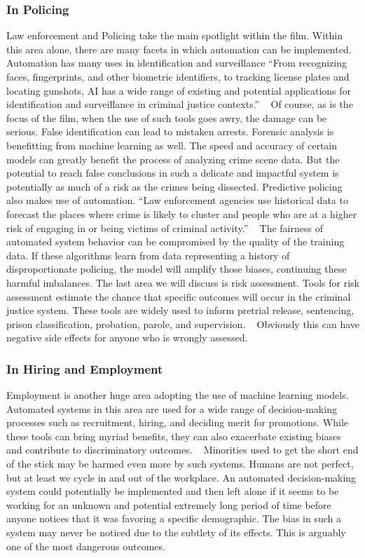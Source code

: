 \documentclass[sigconf, 10pt]{acmart}
\begin{document}
\subsubsection{In Policing}
Law enforcement and Policing take the main spotlight within the film. Within this area alone, there are many facets in which automation can be implemented. Automation has many uses in identification and surveillance “From recognizing faces, fingerprints, and other biometric identifiers, to tracking license plates and locating gunshots, AI has a wide range of existing and potential applications for identification and surveillance in criminal justice contexts.” ~\cite{used_fifth(4)} Of course, as is the focus of the film, when the use of such tools goes awry, the damage can be serious. False identification can lead to mistaken arrests. Forensic analysis is benefitting from machine learning as well. The speed and accuracy of certain models can greatly benefit the process of analyzing crime scene data. But the potential to reach false conclusions in such a delicate and impactful system is potentially as much of a risk as the crimes being dissected. Predictive policing also makes use of automation. “Law enforcement agencies use historical data to forecast the places where crime is likely to cluster and people who are at a higher risk of engaging in or being victims of criminal activity.” ~\cite{used_fifth(4)} The fairness of automated system behavior can be compromised by the quality of the training data. If these algorithms learn from data representing a history of disproportionate policing, the model will amplify those biases, continuing these harmful imbalances. The last area we will discuss is risk assessment. Tools for risk assessment estimate the chance that specific outcomes will occur in the criminal justice system. These tools are widely used to inform pretrial release, sentencing, prison classification, probation, parole, and supervision. ~\cite{used_fifth(4)} Obviously this can have negative side effects for anyone who is wrongly assessed.
\subsubsection{In Hiring and Employment}
Employment is another huge area adopting the use of machine learning models. Automated systems in this area are used for a wide range of decision-making processes such as recruitment, hiring, and deciding merit for promotions. While these tools can bring myriad benefits, they can also exacerbate existing biases and contribute to discriminatory outcomes. ~\cite{used_sixth(5)} Minorities used to get the short end of the stick may be harmed even more by such systems. Humans are not perfect, but at least we cycle in and out of the workplace. An automated decision-making system could potentially be implemented and then left alone if it seems to be working for an unknown and potential extremely long period of time before anyone notices that it was favoring a specific demographic. The bias in such a system may never be noticed due to the subtlety of its effects. This is arguably one of the most dangerous outcomes.
\end{document}
